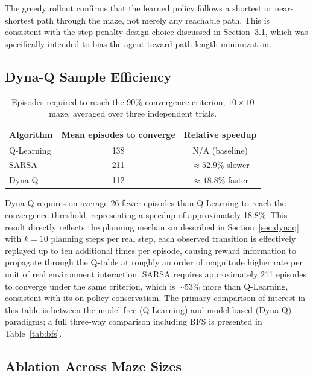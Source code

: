 \documentclass[11pt]{article}
\begin{document}
The greedy rollout confirms that the learned policy follows a shortest or
near-shortest path through the maze, not merely any reachable path. This
is consistent with the step-penalty design choice discussed in
Section~3.1, which was specifically intended to bias the agent toward
path-length minimization.

\subsection{Dyna-Q Sample Efficiency}
\label{sec:sample_eff}

\begin{table}[H]
\centering
\caption{Episodes required to reach the 90\% convergence criterion,
$10\times10$ maze, averaged over three independent trials.}
\label{tab:sample-eff}
\begin{tabular}{lcc}
\toprule
Algorithm & Mean episodes to converge & Relative speedup \\
\midrule
Q-Learning & 138 & N/A (baseline) \\
SARSA      & 211 & $\approx 52.9\%$ slower \\
Dyna-Q     & 112 & $\approx 18.8\%$ faster \\
\bottomrule
\end{tabular}
\end{table}

Dyna-Q requires on average 26 fewer episodes than Q-Learning to reach
the convergence threshold, representing a speedup of approximately 18.8\%.
This result directly reflects the planning mechanism described in
Section~\ref{sec:dynaq}: with $k = 10$ planning steps per real step,
each observed transition is effectively replayed up to ten additional
times per episode, causing reward information to propagate through the
Q-table at roughly an order of magnitude higher rate per unit of real
environment interaction. SARSA requires approximately 211 episodes to converge under the same
criterion, which is $\sim$53\% more than Q-Learning, consistent with its
on-policy conservatism. The primary comparison of interest in this table
is between the model-free (Q-Learning) and model-based (Dyna-Q) paradigms;
a full three-way comparison including BFS is presented in
Table~\ref{tab:bfs}.

\subsection{Ablation Across Maze Sizes}
\label{sec:ablation}
\end{document}
